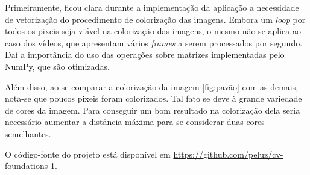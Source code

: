 \documentclass{bmvc2k}
\begin{document}
Primeiramente, ficou clara durante a implementação da aplicação a necessidade de vetorização do procedimento de colorização das imagens. Embora um \textit{loop} por todos os pixeis seja viável na colorização das imagens, o mesmo não se aplica ao caso dos vídeos, que apresentam vários \textit{frames} a serem processados por segundo. Daí a importância do uso das operações sobre matrizes implementadas pelo NumPy, que são otimizadas.

Além disso, ao se comparar a colorização da imagem \ref{fig:pavão} com as demais, nota-se que poucos pixeis foram colorizados. Tal fato se deve à grande variedade de cores da imagem. Para conseguir um bom resultado na colorização dela seria necessário aumentar a distância máxima para se considerar duas cores semelhantes.

O código-fonte do projeto está disponível em \href{https://github.com/peluz/cv-foundations-1}{https://github.com/peluz/cv-foundations-1}.


\end{document}
